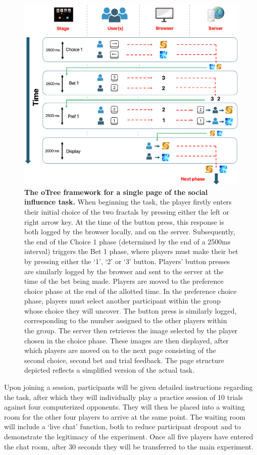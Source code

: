 \documentclass[12pt,a4paper,oneside,]{book} %
\begin{document}
\begin{figure}
\includegraphics[width=1\linewidth]{figures/otree_flowchart} \caption{{\textbf{The oTree framework for a single page of the social influence task.} When beginning the task, the player firstly enters their initial choice of the two fractals by pressing either the left or right arrow key. At the time of the button press, this response is both logged by the browser locally, and on the server. Subsequently, the end of the Choice 1 phase (determined by the end of a 2500ms interval) triggers the Bet 1 phase, where players must make their bet by pressing either the `1', `2' or `3' button. Players' button presses are similarly logged by the browser and sent to the server at the time of the bet being made. Players are moved to the preference choice phase at the end of the allotted time. In the preference choice phase, players must select another participant within the group whose choice they will uncover. The button press is similarly logged, corresponding to the number assigned to the other players within the group. The server then retrieves the image selected by the player chosen in the choice phase. These images are then displayed, after which players are moved on to the next page consisting of the second choice, second bet and trial feedback. The page structure depicted reflects a simplified version of the actual task.}}\label{fig:figure-1-otree}
\end{figure}



Upon joining a session, participants will be given detailed instructions regarding the task, after which they will individually play a practice session of 10 trials against four computerized opponents. They will then be placed into a waiting room for the other four players to arrive at the same point. The waiting room will include a `live chat' function, both to reduce participant dropout and to demonstrate the legitimacy of the experiment. Once all five players have entered the chat room, after 30 seconds they will be transferred to the main experiment.
\end{document}
